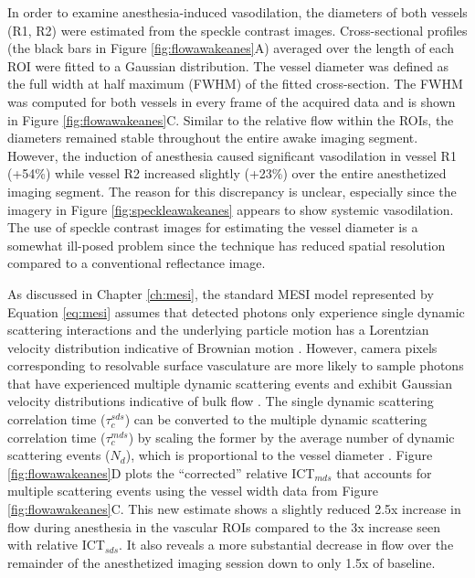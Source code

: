 In order to examine anesthesia-induced vasodilation, the diameters of both vessels (R1, R2) were estimated from the speckle contrast images. Cross-sectional profiles (the black bars in Figure \ref{fig:flowawakeanes}A) averaged over the length of each ROI were fitted to a Gaussian distribution. The vessel diameter was defined as the full width at half maximum (FWHM) of the fitted cross-section. The FWHM was computed for both vessels in every frame of the acquired data and is shown in Figure \ref{fig:flowawakeanes}C. Similar to the relative flow within the ROIs, the diameters remained stable throughout the entire awake imaging segment. However, the induction of anesthesia caused significant vasodilation in vessel R1 (+54\%) while vessel R2 increased slightly (+23\%) over the entire anesthetized imaging segment. The reason for this discrepancy is unclear, especially since the imagery in Figure \ref{fig:speckleawakeanes} appears to show systemic vasodilation. The use of speckle contrast images for estimating the vessel diameter is a somewhat ill-posed problem since the technique has reduced spatial resolution compared to a conventional reflectance image.

As discussed in Chapter \ref{ch:mesi}, the standard MESI model represented by Equation \ref{eq:mesi} assumes that detected photons only experience single dynamic scattering interactions and the underlying particle motion has a Lorentzian velocity distribution indicative of Brownian motion \cite{Parthasarathy:2008el}. However, camera pixels corresponding to resolvable surface vasculature are more likely to sample photons that have experienced multiple dynamic scattering events \cite{Davis:2014kc} and exhibit Gaussian velocity distributions indicative of bulk flow \cite{Kazmi:2015du}. The single dynamic scattering correlation time ($\tau_c^{sds}$) can be converted to the multiple dynamic scattering correlation time ($\tau_c^{mds}$) by scaling the former by the average number of dynamic scattering events ($N_d$), which is proportional to the vessel diameter \cite{Kazmi:2015du}. Figure \ref{fig:flowawakeanes}D plots the ``corrected'' relative ICT$_{mds}$ that accounts for multiple scattering events using the vessel width data from Figure \ref{fig:flowawakeanes}C. This new estimate shows a slightly reduced 2.5x increase in flow during anesthesia in the vascular ROIs compared to the 3x increase seen with relative ICT$_{sds}$. It also reveals a more substantial decrease in flow over the remainder of the anesthetized imaging session down to only 1.5x of baseline.

